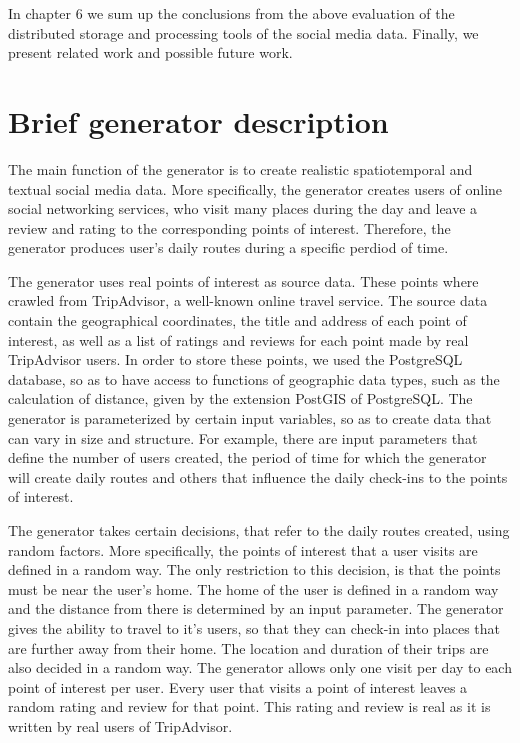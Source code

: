 In chapter 6 we sum up the conclusions from the above evaluation of the distributed storage and processing tools of the social media data. Finally, we 
present related work and possible future work.

\section{Brief generator description}

The main function of the generator is to create realistic spatiotemporal and textual social media data. More specifically, the generator creates users 
of online social networking services, who visit many places during the day and leave a review and rating to the corresponding points of interest. 
Therefore, the generator produces user's daily routes during a specific perdiod of time.

The generator uses real points of interest as source data. These points where crawled from TripAdvisor, a well-known online travel service. 
The source data contain the geographical coordinates, the title and address of each point of interest, as well as a list of ratings and reviews for each point 
made by real TripAdvisor users. In order to store these points, we used the PostgreSQL database, so as to have access to functions of geographic data types, 
such as the calculation of distance, 
given by the extension PostGIS of PostgreSQL. The generator is parameterized by certain input variables, so as to create data that can vary in size and structure. 
For example, there are input parameters that define the number of users created, the period of time for which the generator will create daily routes and 
others that influence the daily check-ins to the points of interest. 

The generator takes certain decisions, that refer to the daily routes created, using random factors. More specifically, the points of interest that a user visits 
are defined in a random way. The only restriction to this decision, is that the points must be near the user's home. The home of the user is defined in a random 
way and the distance from there is determined by an input parameter. The generator gives the ability to travel to it's users, so that they can check-in into 
places that are further away from their home. The location and duration of their trips are also decided in a random way. The generator 
allows only one visit per day to each point of interest per user. Every user that visits a point of interest leaves a random rating and review for that point. 
This rating and review is real as it is written by real users of TripAdvisor. 

